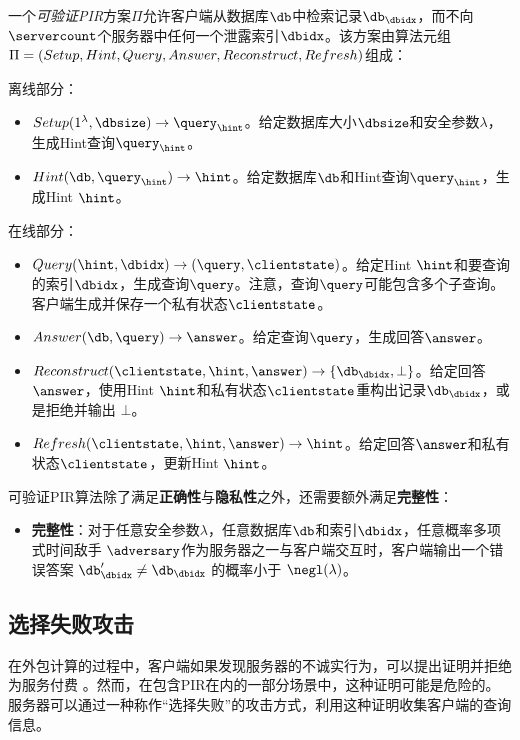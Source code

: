 \begin{definition}[可验证PIR]
    一个\textit{可验证PIR}方案$\Pi$允许客户端从数据库$\db$中检索记录$\db_\dbidx$，而不向$\servercount$个服务器中任何一个泄露索引$\dbidx$。该方案由算法元组$\Pi = (Setup, Hint, Query,\\ Answer, Reconstruct, Refresh)$组成：

    离线部分：
    \begin{itemize}[leftmargin=*]
        \item $Setup(1^\lambda,\dbsize) \rightarrow \query_\hint$。给定数据库大小$\dbsize$和安全参数$\lambda$，生成Hint查询$\query_\hint$。
        \item $Hint(\db, \query_\hint) \rightarrow \hint$。给定数据库$\db$和Hint查询$\query_\hint$，生成Hint $\hint$。
    \end{itemize}
    在线部分：
    \begin{itemize}[leftmargin=*]
        \item $Query(\hint, \dbidx) \rightarrow (\query, \clientstate)$。给定Hint $\hint$和要查询的索引$\dbidx$，生成查询$\query$。注意，查询$\query$可能包含多个子查询。客户端生成并保存一个私有状态$\clientstate$。
        \item $Answer(\db, \query) \rightarrow \answer$。给定查询$\query$，生成回答$\answer$。
        \item $Reconstruct(\clientstate, \hint, \answer) \rightarrow \{\db_\dbidx, \bot\}$。给定回答$\answer$，使用Hint $\hint$和私有状态$\clientstate$重构出记录$\db_\dbidx$，或是拒绝并输出 $\bot$。
        \item $Refresh(\clientstate, \hint, \answer) \rightarrow \hint$。给定回答$\answer$和私有状态$\clientstate$，更新Hint $\hint$。
    \end{itemize}
    可验证PIR算法除了满足\textbf{正确性}与\textbf{隐私性}之外，还需要额外满足\textbf{完整性}：
    \begin{itemize}
        \item \textbf{完整性}：对于任意安全参数$\lambda$，任意数据库$\db$和索引$\dbidx$，任意概率多项式时间敌手 $\adversary$作为服务器之一与客户端交互时，客户端输出一个错误答案 $\db_\dbidx' \neq \db_\dbidx$ 的概率小于 $\negl(\lambda)$。
    \end{itemize}
\end{definition}

\subsection{选择失败攻击}
在外包计算的过程中，客户端如果发现服务器的不诚实行为，可以提出证明并拒绝为服务付费 \cite{chen2012efficient, carbunar2011payments}。然而，在包含PIR在内的一部分场景中，这种证明可能是危险的。服务器可以通过一种称作“选择失败”的攻击方式，利用这种证明收集客户端的查询信息。

